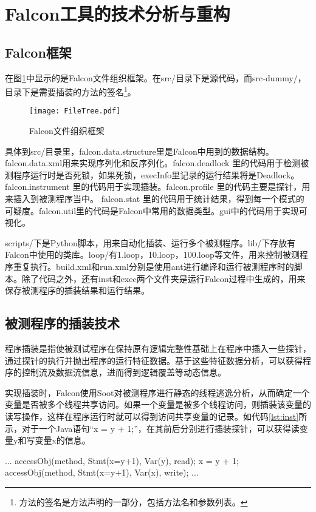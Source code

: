 ﻿\section{Falcon工具的技术分析与重构}
\subsection{Falcon框架}
在图\ref{pic:falconFrame}中显示的是Falcon文件组织框架。在src/目录下是源代码，而src-dummy/，目录下是需要插装的方法的签名\footnote{方法的签名是方法声明的一部分，包括方法名和参数列表。}。
\begin{figure}[!ht]
  \centering
  \texttt{[image: FileTree.pdf]}
  \caption{Falcon文件组织框架}\label{pic:falconFrame}
\end{figure}
具体到src/目录里，falcon.data.structure里是Falcon中用到的数据结构。falcon.data.xml用来实现序列化和反序列化。falcon.deadlock 里的代码用于检测被测程序运行时是否死锁，如果死锁，execInfo里记录的运行结果将是Deadlock。falcon.instrument 里的代码用于实现插装。falcon.profile 里的代码主要是探针，用来插入到被测程序当中。
falcon.stat 里的代码用于统计结果，得到每一个模式的可疑度。falcon.util里的代码是Falcon中常用的数据类型。gui中的代码用于实现可视化。\par
scripts/下是Python脚本，用来自动化插装、运行多个被测程序。lib/下存放有Falcon中使用的类库。loop/有1.loop，10.loop，100.loop等文件，用来控制被测程序重复执行。build.xml和run.xml分别是使用ant进行编译和运行被测程序时的脚本。除了代码之外，还有inst和exec两个文件夹是运行Falcon过程中生成的，用来保存被测程序的插装结果和运行结果。\par
\subsection{被测程序的插装技术}
程序插装是指使被测试程序在保持原有逻辑完整性基础上在程序中插入一些探针，通过探针的执行并抛出程序的运行特征数据。基于这些特征数据分析，可以获得程序的控制流及数据流信息，进而得到逻辑覆盖等动态信息\cite{Instrument}。\par
实现插装时，Falcon使用Soot对被测程序进行静态的线程逃逸分析，从而确定一个变量是否被多个线程共享访问。如果一个变量是被多个线程访问，则插装该变量的读写操作，这样在程序运行时就可以得到访问共享变量的记录。如代码\ref{lst:inst}所示，对于一个Java语句``x = y + 1;''，在其前后分别进行插装探针，可以获得读变量y和写变量x的信息。
\begin{code}[language={[AspectJ]Java}, label=lst:inst, caption=插装程序读写操作示意]
  ...
  accessObj(method, Stmt(x=y+1), Var(y), read);
  x = y + 1;
  accessObj(method, Stmt(x=y+1), Var(x), write);
  ...
\end{code}
